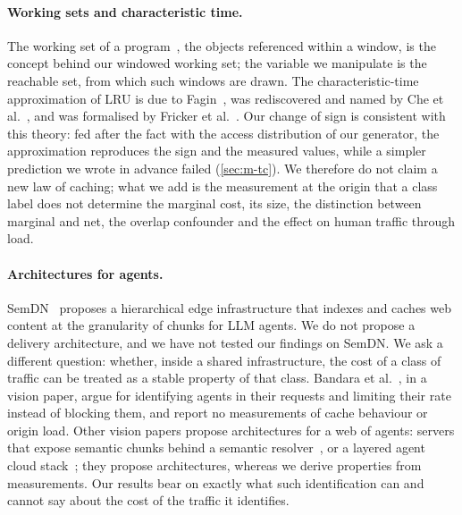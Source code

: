 \paragraph{Working sets and characteristic time.}
The working set of a program~\cite{denning1968}, the objects referenced within a window,
is the concept behind our windowed working set; the variable we manipulate is the reachable
set, from which such windows are drawn.
The characteristic-time approximation of LRU is due to Fagin~\cite{fagin1977}, was
rediscovered and named by Che et al.~\cite{che2002}, and was formalised by Fricker et
al.~\cite{fricker2012}.
Our change of sign is consistent with this theory: fed after the fact with the access
distribution of our generator, the approximation reproduces the sign and the measured
values, while a simpler prediction we wrote in advance failed (\cref{sec:m-tc}).
We therefore do not claim a new law of caching; what we add is the measurement at the
origin that a class label does not determine the marginal cost, its size, the distinction
between marginal and net, the overlap confounder and the effect on human traffic through
load.

\paragraph{Architectures for agents.}
SemDN~\cite{hua2026semdn} proposes a hierarchical edge infrastructure that indexes and
caches web content at the granularity of chunks for LLM agents.
We do not propose a delivery architecture, and we have not tested our findings on
SemDN.
We ask a different question: whether, inside a shared infrastructure, the cost of a class
of traffic can be treated as a stable property of that class.
Bandara et al.~\cite{bandara2026agentfirst}, in a vision paper, argue for identifying agents
in their requests and limiting their rate instead of blocking them, and report no
measurements of cache behaviour or origin load.
Other vision papers propose architectures for a web of agents: servers that expose
semantic chunks behind a semantic resolver~\cite{bilal2025ainative}, or a layered agent
cloud stack~\cite{dey2026agenticweb}; they propose architectures, whereas we derive
properties from measurements.
Our results bear on exactly what such identification can and cannot say about the cost of
the traffic it identifies.
